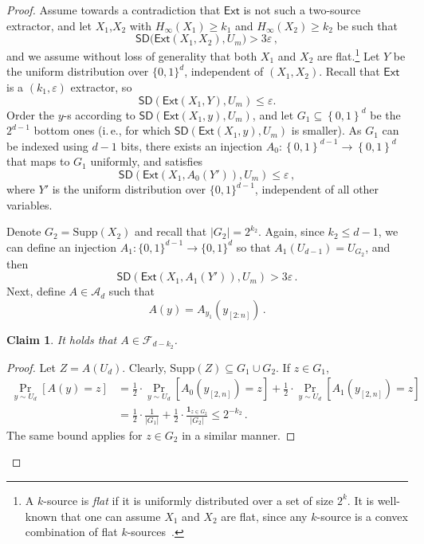 \documentclass[11pt]{article}
\numberwithin{equation}{section}
\newtheorem{claim}[theorem]{Claim}
\theoremstyle{definition}
\theoremstyle{plain}
\newcommand{\ie}{i.\,e.}
\newcommand{\ext}{\mathsf{Ext}}
\newcommand{\adv}{A}
\newcommand{\advfam}{\mathcal{A}}
\newcommand{\eps}{\varepsilon}
\newcommand{\set}[1]{\left\{{#1}\right\}}
\newcommand{\B}{\set{0,1}}
\newcommand{\advfampart}{\mathcal{F}}
\newcommand{\minent}[1]{H_{\infty}(#1)}
\def\SD{\ensuremath{\mathsf{SD}}}
\begin{document}
\begin{proof}
 Assume towards a contradiction that $\ext$ is not such a two-source extractor, and let $X_1$,$ X_2$ with  $\minent{X_1} \geq k_1$ and $\minent{X_2} \geq k_2$ be such that 
	\[
	\SD\big(\ext(X_1,X_2), U_m \big) > 3\eps\,,
	\]
and we assume without loss of generality that both $X_1$ and $X_2$
are flat.\footnote{A $k$-source is \emph{flat} if it is uniformly distributed over a set of size $2^k$. It is well-known that one can assume $X_1$ and $X_2$ are flat, since any $k$-source is a convex combination of flat $k$-sources~\cite{CG88}.}
	Let $Y$ be the uniform distribution over $\{0,1\}^d$, independent of $(X_1, X_2)$.
	Recall that $\ext$ is a $(k_1, \eps)$ extractor, so 
	\[
	\SD(\ext(X_1,Y) ,U_m) \le \eps.
	\]
Order the $y$-s according to $\SD(\ext(X_1,y),U_m)$, and let $G_1 \subseteq \B^d$
be the $2^{d-1}$ bottom ones (\ie, for which $\SD(\ext(X_1,y),U_m)$ is smaller).
As $G_1$ can be indexed using $d-1$ bits, there exists an injection
$\adv_0 \colon \B^{d-1} \rightarrow \B^{d}$ that maps to $G_1$ uniformly, and satisfies
		\begin{equation}\label{eq:1}
	\SD(\ext(X_1,\adv_0(Y')),U_m) \leq \eps\,,
	\end{equation}
	where $Y'$ is the uniform distribution over $\{0,1\}^{d-1}$, independent of
	all other variables.

Denote $G_2 = \mathrm{Supp}(X_2)$ and recall that $|G_2| = 2^{k_2}$.
Again, since $k_2 \leq d -1$, we can define an injection $\adv_1 \colon \{0,1\}^{d-1} \rightarrow \{0,1\}^d$
so that $\adv_1(U_{d-1}) = U_{G_2}$, and then
	\begin{equation}\label{eq:2}
	\SD(\ext(X_1,\adv_1(Y')),U_m) > 3\eps\,.
	\end{equation}
Next, define $\adv \in \advfam_d$ such that \[\adv(y) = \adv_{y_1}(y_{[2:n]})\,.\]
\begin{claim}
It holds that $\adv\in \advfampart_{d-k_2}$.
\end{claim}
\begin{proof}
Let $Z = A(U_d)$. Clearly, $\mathrm{Supp}(Z) \subseteq G_1 \cup G_2$.
If $z \in G_1$,
\begin{align*}
\Pr_{y \sim U_d}[A(y) = z] &= \frac{1}{2} \cdot \Pr_{y \sim U_d}[\adv_0(y_{[2,n]})  = z]
+ \frac{1}{2} \cdot \Pr_{y \sim U_d}[\adv_1(y_{[2,n]})  = z] \\
&= \frac{1}{2} \cdot \frac{1}{|G_1|} + \frac{1}{2} \cdot \frac{\mathbf{1}_{z \in G_2}}{|G_2|}
\le 2^{-k_2}\,.
\end{align*}
The same bound applies for $z \in G_2$ in a similar manner.
\end{proof}



\end{proof}
\end{document}
